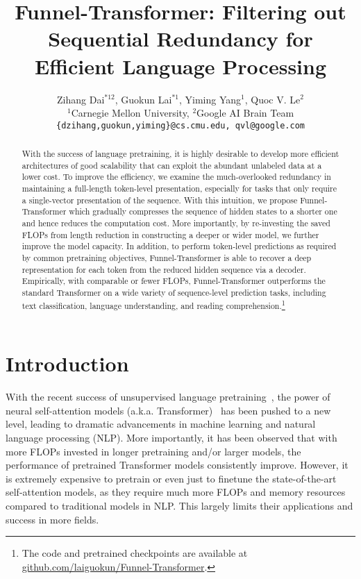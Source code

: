\documentclass{article}
\title{Funnel-Transformer: Filtering out Sequential Redundancy for Efficient Language Processing}
\author{
	Zihang Dai$^{*12}$, Guokun Lai$^{*1}$,  Yiming Yang$^1$,  Quoc V. Le$^2$\\
	$^1$Carnegie Mellon University, $^2$Google AI Brain Team \\
	\texttt{\{dzihang,guokun,yiming\}@cs.cmu.edu, qvl@google.com}
}
\theoremstyle{custom}
\begin{document}
\maketitle

\renewcommand{\thefootnote}{\fnsymbol{footnote}}
\renewcommand{\thefootnote}{\arabic{footnote}}

\begin{abstract}
With the success of language pretraining, it is highly desirable to develop more efficient architectures of good scalability that can exploit the abundant unlabeled data at a lower cost.
To improve the efficiency, we examine the much-overlooked redundancy in maintaining a full-length token-level presentation, especially for tasks that only require a single-vector presentation of the sequence.
With this intuition, we propose Funnel-Transformer which gradually compresses the sequence of hidden states to a shorter one and hence reduces the computation cost.
More importantly, by re-investing the saved FLOPs from length reduction in constructing a deeper or wider model, we further improve the model capacity.
In addition, to perform token-level predictions as required by common pretraining objectives, Funnel-Transformer is able to recover a deep representation for each token from the reduced hidden sequence via a decoder.
Empirically, with comparable or fewer FLOPs, Funnel-Transformer outperforms the standard Transformer on a wide variety of sequence-level prediction tasks, including text classification, language understanding, and reading comprehension.\footnote{The code and pretrained checkpoints are available at \footnotesize \url{ github.com/laiguokun/Funnel-Transformer}.}
\end{abstract}

\section{Introduction}
\label{sec:intro}
With the recent success of unsupervised language pretraining~\cite{peters2018deep,devlin2018bert,yang2019xlnet,liu2019roberta,clark2020electra,lan2019albert,kong2019mutual,raffel2019exploring,lewis2019bart,song2019mass,liu2019multi,song2020mpnet}, the power of neural self-attention models (a.k.a. Transformer)~\cite{vaswani2017attention} has been pushed to a new level, leading to dramatic advancements in machine learning and 
natural language processing (NLP).
More importantly, it has been observed that with more FLOPs invested in longer pretraining and/or larger models, the performance of pretrained Transformer models consistently improve.
However, it is extremely expensive to pretrain or even just to finetune the state-of-the-art self-attention models, as they require much more FLOPs and memory resources compared to traditional models in NLP.
This largely limits their applications and success in more fields.
\end{document}
